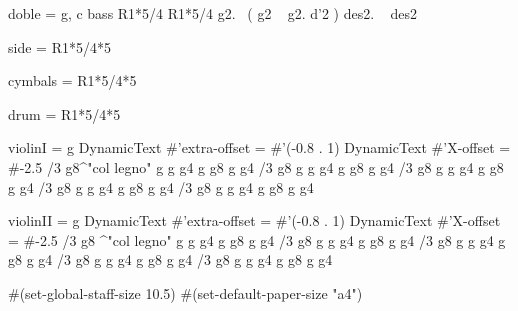 
             doble = \relative  g, { \key c \major
			\clef bass
			R1*5/4 R1*5/4
			g2.\p ~ ( g2 ~ g2. \< d'2 \! ) des2. \> ~ des2 \! \laissezVibrer %
	     }



	side  = { R1*5/4*5 }


	cymbals  = { R1*5/4*5 }


	drum  = { R1*5/4*5 }


       violinI = \relative g {
	\once \override DynamicText #'extra-offset = #'(-0.8 . 1)
	\once \override DynamicText #'X-offset = #-2.5
	/3 { g8\p ^"col legno" g g }  g4 g g8 g g4
	/3 { g8 g g } g4 g g8 g g4
	/3 { g8 g g } g4 g g8 g g4
	/3 { g8 \< g g } g4 g g8 g g4\!
	/3 { g8 \> g g } g4 g g8 g g4\! }


	violinII = \relative g {
		\once \override DynamicText #'extra-offset = #'(-0.8 . 1)
		\once \override DynamicText #'X-offset = #-2.5
		/3 { g8 \p ^"col legno" g g }  g4 g g8 g g4
		/3 { g8 g g } g4 g g8 g g4
		/3 { g8 g g } g4 g g8 g g4
		/3 { g8 \< g g } g4 g g8 g g4\!
		/3 { g8 \> g g } g4 g g8 g g4\! }


        #(set-global-staff-size 10.5)  %
	#(set-default-paper-size "a4") %



